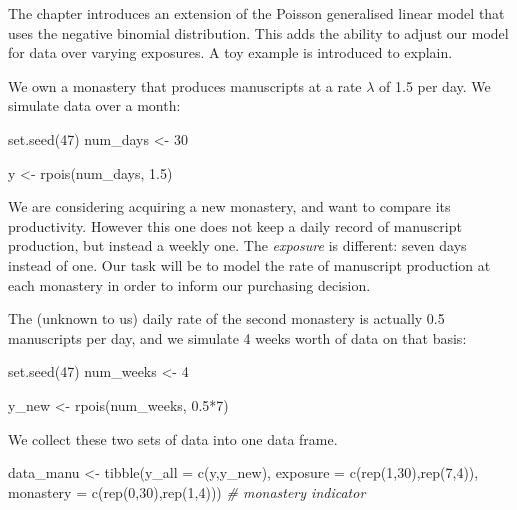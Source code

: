 \documentclass[
]{book}
\newenvironment{Shaded}{\begin{snugshade}}{\end{snugshade}}
\newcommand{\AttributeTok}[1]{\textcolor[rgb]{0.77,0.63,0.00}{#1}}
\newcommand{\CommentTok}[1]{\textcolor[rgb]{0.56,0.35,0.01}{\textit{#1}}}
\newcommand{\DecValTok}[1]{\textcolor[rgb]{0.00,0.00,0.81}{#1}}
\newcommand{\FloatTok}[1]{\textcolor[rgb]{0.00,0.00,0.81}{#1}}
\newcommand{\FunctionTok}[1]{\textcolor[rgb]{0.00,0.00,0.00}{#1}}
\newcommand{\NormalTok}[1]{#1}
\newcommand{\OtherTok}[1]{\textcolor[rgb]{0.56,0.35,0.01}{#1}}
\newcommand{\SpecialCharTok}[1]{\textcolor[rgb]{0.00,0.00,0.00}{#1}}
\begin{document}
The chapter introduces an extension of the Poisson generalised linear model that uses the negative binomial distribution. This adds the ability to adjust our model for data over varying exposures. A toy example is introduced to explain.

We own a monastery that produces manuscripts at a rate \(\lambda\) of 1.5 per day. We simulate data over a month:

\begin{Shaded}
\begin{Highlighting}[]
\FunctionTok{set.seed}\NormalTok{(}\DecValTok{47}\NormalTok{)}
\NormalTok{num\_days }\OtherTok{\textless{}{-}} \DecValTok{30}

\NormalTok{y }\OtherTok{\textless{}{-}} \FunctionTok{rpois}\NormalTok{(num\_days, }\FloatTok{1.5}\NormalTok{)}
\end{Highlighting}
\end{Shaded}

We are considering acquiring a new monastery, and want to compare its productivity. However this one does not keep a daily record of manuscript production, but instead a weekly one. The \emph{exposure} is different: seven days instead of one. Our task will be to model the rate of manuscript production at each monastery in order to inform our purchasing decision.

The (unknown to us) daily rate of the second monastery is actually 0.5 manuscripts per day, and we simulate 4 weeks worth of data on that basis:

\begin{Shaded}
\begin{Highlighting}[]
\FunctionTok{set.seed}\NormalTok{(}\DecValTok{47}\NormalTok{)}
\NormalTok{num\_weeks }\OtherTok{\textless{}{-}} \DecValTok{4}

\NormalTok{y\_new }\OtherTok{\textless{}{-}} \FunctionTok{rpois}\NormalTok{(num\_weeks, }\FloatTok{0.5}\SpecialCharTok{*}\DecValTok{7}\NormalTok{)}
\end{Highlighting}
\end{Shaded}

We collect these two sets of data into one data frame.

\begin{Shaded}
\begin{Highlighting}[]
\NormalTok{data\_manu }\OtherTok{\textless{}{-}} \FunctionTok{tibble}\NormalTok{(}\AttributeTok{y\_all =} \FunctionTok{c}\NormalTok{(y,y\_new),}
                    \AttributeTok{exposure =} \FunctionTok{c}\NormalTok{(}\FunctionTok{rep}\NormalTok{(}\DecValTok{1}\NormalTok{,}\DecValTok{30}\NormalTok{),}\FunctionTok{rep}\NormalTok{(}\DecValTok{7}\NormalTok{,}\DecValTok{4}\NormalTok{)),}
                    \AttributeTok{monastery =} \FunctionTok{c}\NormalTok{(}\FunctionTok{rep}\NormalTok{(}\DecValTok{0}\NormalTok{,}\DecValTok{30}\NormalTok{),}\FunctionTok{rep}\NormalTok{(}\DecValTok{1}\NormalTok{,}\DecValTok{4}\NormalTok{))) }\CommentTok{\# monastery indicator}
\end{Highlighting}
\end{Shaded}
\end{document}
